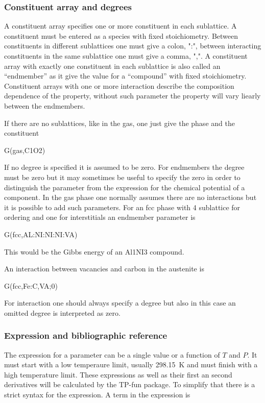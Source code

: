 \documentclass[12pt]{article}
\begin{document}
\subsubsection{Constituent array and degrees}

A constituent array specifies one or more constituent in each
sublattice.  A constituent must be entered as a species with fixed
stoichiometry.  Between constituents in different sublattices one must
give a colon, ":", between interacting constituents in the same
sublattice one must give a comma, ",".  A constituent array with
exactly one constituent in each sublattice is also called an
``endmember'' as it give the value for a ``compound'' with fixed
stoichiometry.  Constituent arrays with one or more interaction
describe the composition dependence of the property, without such
parameter the property will vary liearly between the endmembers.

If there are no sublattices, like in the gas, one just give the phase
and the constituent

G(gas,C1O2)

If no degree is specified it is assumed to be zero.  For endmembers
the degree must be zero but it may sometimes be useful to specify the
zero in order to distinguish the parameter from the expression for the
chemical potential of a component.  In the gas phase one normally
assumes there are no interactions but it is possible to add such
parameters.  For an fcc phase with 4 sublattice for ordering and one
for interstitials an endmember parameter is

G(fcc,AL:NI:NI:NI:VA)

This would be the Gibbs energy of an Al1NI3 compound.

An interaction between vacancies and carbon in the austenite is

G(fcc,Fe:C,VA;0)

For interaction one should always specify a degree but also in this
case an omitted degree is interpreted as zero.

\subsubsection{Expression and bibliographic reference}

The expression for a parameter can be a single value or a function of
$T$ and $P$.  It must start with a low temperaure limit, usually
298.15~K and must finish with a high temperature limit.  These
expressions as well as their first an second derivatives will be
calculated by the TP-fun package.  To simplify that there is a strict
syntax for the expression.  A term in the expression is
\end{document}
